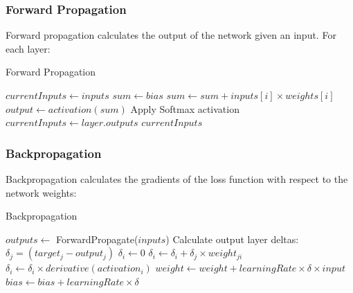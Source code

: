 \documentclass[12pt]{article}
\begin{document}
\subsubsection{Forward Propagation}

Forward propagation calculates the output of the network given an input. For each layer:

\begin{algorithm}
\caption{Forward Propagation}
\begin{algorithmic}[1]
    \State $currentInputs \gets inputs$
            \State $sum \gets bias$
                \State $sum \gets sum + inputs[i] \times weights[i]$
            \EndFor
            \State $output \gets activation(sum)$
        \EndFor
            \State Apply Softmax activation
        \EndIf
        \State $currentInputs \gets layer.outputs$
    \EndFor
    \State \Return $currentInputs$
\EndProcedure
\end{algorithmic}
\end{algorithm}

\subsubsection{Backpropagation}

Backpropagation calculates the gradients of the loss function with respect to the network weights:

\begin{algorithm}
\caption{Backpropagation}
\begin{algorithmic}[1]
    \State $outputs \gets$ ForwardPropagate($inputs$)
    \State Calculate output layer deltas: $\delta_j = (target_j - output_j)$
            \State $\delta_i \gets 0$
                \State $\delta_i \gets \delta_i + \delta_j \times weight_{ji}$
            \EndFor
            \State $\delta_i \gets \delta_i \times derivative(activation_i)$
        \EndFor
    \EndFor
                \State $weight \gets weight + learningRate \times \delta \times input$
            \EndFor
            \State $bias \gets bias + learningRate \times \delta$
        \EndFor
    \EndFor
\EndProcedure
\end{algorithmic}
\end{algorithm}
\end{document}
